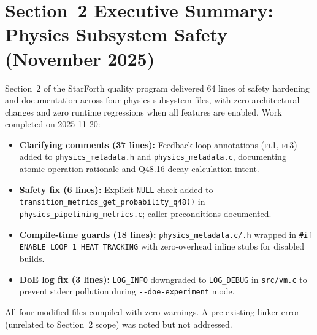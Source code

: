 
\section*{Section~2 Executive Summary: Physics Subsystem Safety (November 2025)}

Section~2 of the StarForth quality program delivered 64 lines of safety
hardening and documentation across four physics subsystem files, with zero
architectural changes and zero runtime regressions when all features are
enabled. Work completed on 2025-11-20:

\begin{itemize}
  \item \textbf{Clarifying comments (37 lines):} Feedback-loop annotations
        (\textsc{fl1}, \textsc{fl3}) added to \texttt{physics\_metadata.h}
        and \texttt{physics\_metadata.c}, documenting atomic operation
        rationale and Q48.16 decay calculation intent.
  \item \textbf{Safety fix (6 lines):} Explicit \texttt{NULL} check added to
        \texttt{transition\_metrics\_get\_probability\_q48()} in
        \texttt{physics\_pipelining\_metrics.c}; caller preconditions documented.
  \item \textbf{Compile-time guards (18 lines):} \texttt{physics\_metadata.c/.h}
        wrapped in \texttt{\#if ENABLE\_LOOP\_1\_HEAT\_TRACKING} with
        zero-overhead inline stubs for disabled builds.
  \item \textbf{DoE log fix (3 lines):} \texttt{LOG\_INFO} downgraded to
        \texttt{LOG\_DEBUG} in \texttt{src/vm.c} to prevent stderr pollution
        during \texttt{-{}-doe-experiment} mode.
\end{itemize}

All four modified files compiled with zero warnings. A pre-existing linker
error (unrelated to Section~2 scope) was noted but not addressed.
